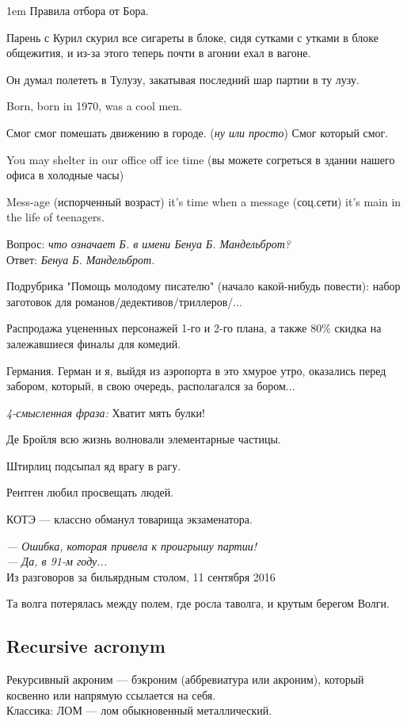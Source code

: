 \begin{flushleft}\parskip1em
Правила отбора от Бора.

Парень с Курил скурил все сигареты в блоке, сидя сутками с утками в блоке общежития, и из-за этого теперь почти в агонии ехал в вагоне.

Он думал полететь в Тулузу, закатывая последний шар партии в ту лузу.

Born, born in 1970, was a cool men.

Смог смог помешать движению в городе. (\emph{ну или просто}) Смог который смог.

You may shelter in our office off ice time (вы можете согреться в здании нашего офиса в холодные часы)

Mess-age (испорченный возраст) it's time when a message (соц.сети) it's main in the life of teenagers.

Вопрос: \emph{что означает Б. в имени Бенуа Б. Мандельброт?}\\
Ответ: \emph{Бенуа Б. Мандельброт.}

Подрубрика "Помощь молодому писателю" (начало какой-нибудь повести): набор заготовок для романов/дедективов/триллеров/...

Распродажа уцененных персонажей 1-го и 2-го плана, а также 80\% скидка на залежавшиеся финалы для комедий.

Германия. Герман и я, выйдя из аэропорта в это хмурое утро, оказались перед забором, который, в свою очередь, располагался за бором...

\emph{4-смысленная фраза:} Хватит мять булки!


Де Бройля всю жизнь волновали элементарные частицы.


Штирлиц подсыпал яд врагу в рагу.


Рентген любил просвещать людей.


КОТЭ --- классно обманул товарища экзаменатора.


\emph{--- Ошибка, которая привела к проигрышу партии!\\
--- Да, в 91-м году...}\\
Из разговоров за бильярдным столом, 11 сентября 2016 


Та волга потерялась между полем, где росла таволга, и крутым берегом Волги. %
\end{flushleft}

\subsection{Recursive acronym}
Рекурсивный акроним --- бэкроним (аббревиатура или акроним), который косвенно или напрямую ссылается на себя.\\
Классика: ЛОМ — лом обыкновенный металлический.


